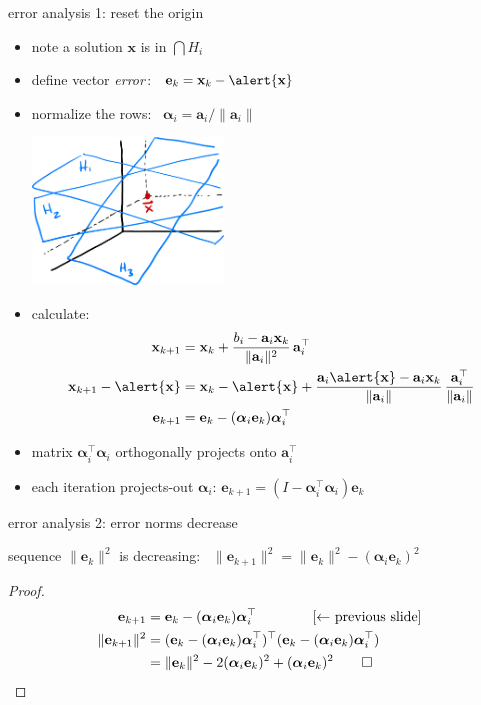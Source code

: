 \documentclass[usepdftitle=false,usenames,dvipsnames]{beamer}
\newcommand{\ba}{\mathbf{a}}
\newcommand{\be}{\mathbf{e}}
\newcommand{\bx}{\mathbf{x}}
\newcommand{\balpha}{\bm{\alpha}}
\begin{document}
\begin{frame}{error analysis 1: reset the origin}

\begin{itemize}
\item note a solution \alert{$\bx$} is in $\bigcap H_i$
\item define vector \emph{error}\,: \, $\be_k = \bx_k - \alert{\bx}$
\item normalize the rows: \, $\balpha_i = \ba_i/\|\ba_i\|$

\vspace{-20mm}
\hfill \includegraphics[width=0.4\textwidth]{figs/hyperintersect.png}

\vspace{-10mm}
\item calculate:
\begin{align*}
\bx_{k+1} &= \bx_k + \frac{b_i - \ba_i \bx_k}{\|\ba_i\|^2}\, \ba_i^\top \hspace{30mm} \\
\bx_{k+1} - \alert{\bx} &= \bx_k - \alert{\bx} + \frac{\ba_i \alert{\bx} - \ba_i \bx_k}{\|\ba_i\|}\,\frac{\ba_i^\top}{\|\ba_i\|}  \\
\be_{k+1} &= \be_k - (\balpha_i \be_k) \balpha_i^\top
\end{align*}
\item matrix $\balpha_i^\top \balpha_i$ orthogonally projects onto $\ba_i^\top$
\item each iteration projects-out $\balpha_i$: \quad $\be_{k+1} = \left(I - \balpha_i^\top \balpha_i\right) \be_k$
\end{itemize}
\end{frame}


\begin{frame}{error analysis 2: error norms decrease}

\begin{lemma}[Kaczmarz, 1937] sequence $\|\be_k\|^2$ is decreasing: \, $\|\be_{k+1}\|^2 = \|\be_k\|^2 - (\balpha_{i} \be_k)^2$
\end{lemma}

\begin{proof}
\begin{align*}
    \be_{k+1} &= \be_k - (\balpha_i \be_k) \balpha_i^\top \qquad\qquad \text{[$\gets$ previous slide]}\\
    \|\be_{k+1}\|^2 &= (\be_k - (\balpha_i \be_k) \balpha_i^\top)^\top (\be_k - (\balpha_i \be_k) \balpha_i^\top) \\
                    &= \|\be_k\|^2 - 2(\balpha_i \be_k)^2 + (\balpha_i \be_k)^2 \qed
\end{align*}
\end{proof}
\end{frame}
\end{document}
